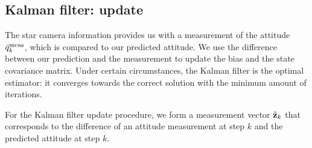 \subsection{Kalman filter: update}
\label{subsec:EKFUpdate}

The star camera information provides us with a measurement of the attitude $\bar{q}^{\textrm{meas}}_{k}$, which is compared to our predicted attitude. We use the difference between our prediction and the measurement to update the bias and the state covariance matrix. Under certain circumstances, the Kalman filter is the optimal estimator: it converges towards the correct solution with the minimum amount of iterations.

For the Kalman filter update procedure, we form a measurement vector $\tilde{\textrm{\textbf{z}}}_{k}$ that corresponds to the difference of an attitude measurement at step $k$ and the predicted attitude at step $k$.

